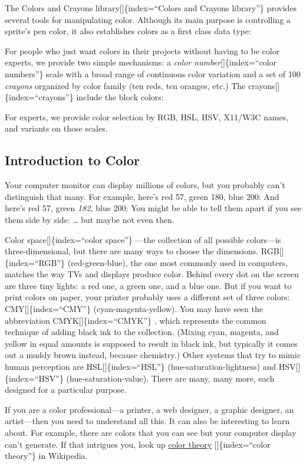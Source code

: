 \documentclass[
  letterpaper,
]{book}
\begin{document}
The Colors and Crayons library{[}{]}\{index=``Colors and Crayons
library''\} provides several tools for manipulating color. Although its
main purpose is controlling a sprite's pen color, it also establishes
colors as a first class data type:

For people who just want colors in their projects without having to be
color experts, we provide two simple mechanisms: a \emph{color
number}{[}{]}\{index=``color numbers''\} scale with a broad range of
continuous color variation and a set of 100 \emph{crayons} organized by
color family (ten reds, ten oranges, etc.) The
crayons{[}{]}\{index=``crayons''\} include the block colors:

For experts, we provide color selection by RGB, HSL, HSV, X11/W3C names,
and variants on those scales.

\subsection{Introduction to Color}\label{introduction-to-color}

Your computer monitor can display millions of colors, but you probably
can't distinguish that many. For example, here's red 57, green 180, blue
200: And here's red 57, green \emph{182,} blue 200: You might be able to
tell them apart if you see them side by side: \ldots{} but maybe not
even then.

Color space{[}{]}\{index=``color space''\} ---the collection of all
possible colors---is three-dimensional, but there are many ways to
choose the dimensions. RGB{[}{]}\{index=``RGB''\} (red-green-blue), the
one most commonly used in computers, matches the way TVs and displays
produce color. Behind every dot on the screen are three tiny lights: a
red one, a green one, and a blue one. But if you want to print colors on
paper, your printer probably uses a different set of three colors:
CMY{[}{]}\{index=``CMY''\} (cyan-magenta-yellow). You may have seen the
abbreviation CMYK{[}{]}\{index=``CMYK''\} , which represents the common
technique of adding black ink to the collection. (Mixing cyan, magenta,
and yellow in equal amounts is supposed to result in black ink, but
typically it comes out a muddy brown instead, because chemistry.) Other
systems that try to mimic human perception are
HSL{[}{]}\{index=``HSL''\} (hue-saturation-lightness) and
HSV{[}{]}\{index=``HSV''\} (hue-saturation-value). There are many, many
more, each designed for a particular purpose.

If you are a color professional---a printer, a web designer, a graphic
designer, an artist---then you need to understand all this. It can also
be interesting to learn about. For example, there are colors that you
can see but your computer display can't generate. If that intrigues you,
look up \href{https://en.wikipedia.org/wiki/Color_theory}{color theory}
{[}{]}\{index=``color theory''\} in Wikipedia.
\end{document}
